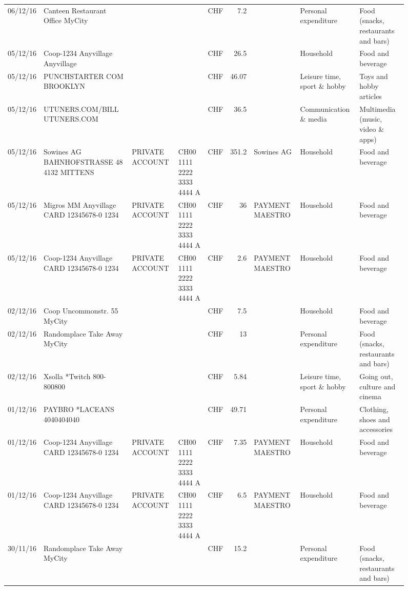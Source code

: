 \begin{landscape}
\begin{sidewaysfigure}
\begin{table}[h]
\begin{center}
\begin{tabular}{rllllrlll}
		06/12/16 & Canteen Restaurant Office      MyCity &       &       & CHF   & 7.2   &       & Personal expenditure & Food (snacks, restaurants and bars) \\
		05/12/16 & Coop-1234 Anyvillage    Anyvillage &       &       & CHF   & 26.5  &       & Household & Food and beverage \\
		05/12/16 & PUNCHSTARTER COM          BROOKLYN &       &       & CHF   & 46.07 &       & Leisure time, sport \& hobby & Toys and hobby articles \\
		05/12/16 & UTUNERS.COM/BILL          UTUNERS.COM &       &       & CHF   & 36.5  &       & Communication \& media & Multimedia (music, video \& apps) \\
		05/12/16 & Sowines AG BAHNHOFSTRASSE 48 4132 MITTENS & PRIVATE ACCOUNT & CH00 1111 2222 3333 4444 A & CHF   & 351.2 & Sowines AG & Household & Food and beverage \\
		05/12/16 & Migros MM Anyvillage CARD 12345678-0 1234 & PRIVATE ACCOUNT & CH00 1111 2222 3333 4444 A & CHF   & 36    & PAYMENT MAESTRO & Household & Food and beverage \\
		05/12/16 & Coop-1234 Anyvillage CARD 12345678-0 1234 & PRIVATE ACCOUNT & CH00 1111 2222 3333 4444 A & CHF   & 2.6   & PAYMENT MAESTRO & Household & Food and beverage \\
		02/12/16 & Coop Uncommonstr. 55   MyCity &       &       & CHF   & 7.5   &       & Household & Food and beverage \\
		02/12/16 & Randomplace Take Away     MyCity &       &       & CHF   & 13    &       & Personal expenditure & Food (snacks, restaurants and bars) \\
		02/12/16 & Xsolla *Twitch           800-800800 &       &       & CHF   & 5.84  &       & Leisure time, sport \& hobby & Going out, culture and cinema \\
		01/12/16 & PAYBRO *LACEANS      4040404040 &       &       & CHF   & 49.71 &       & Personal expenditure & Clothing, shoes and accessories \\
		01/12/16 & Coop-1234 Anyvillage CARD 12345678-0 1234 & PRIVATE ACCOUNT & CH00 1111 2222 3333 4444 A & CHF   & 7.35  & PAYMENT MAESTRO & Household & Food and beverage \\
		01/12/16 & Coop-1234 Anyvillage CARD 12345678-0 1234 & PRIVATE ACCOUNT & CH00 1111 2222 3333 4444 A & CHF   & 6.5   & PAYMENT MAESTRO & Household & Food and beverage \\
		30/11/16 & Randomplace Take Away     MyCity &       &       & CHF   & 15.2  &       & Personal expenditure & Food (snacks, restaurants and bars) \\

\end{tabular}
\end{center}
\end{table}
\end{sidewaysfigure}
\end{landscape}

